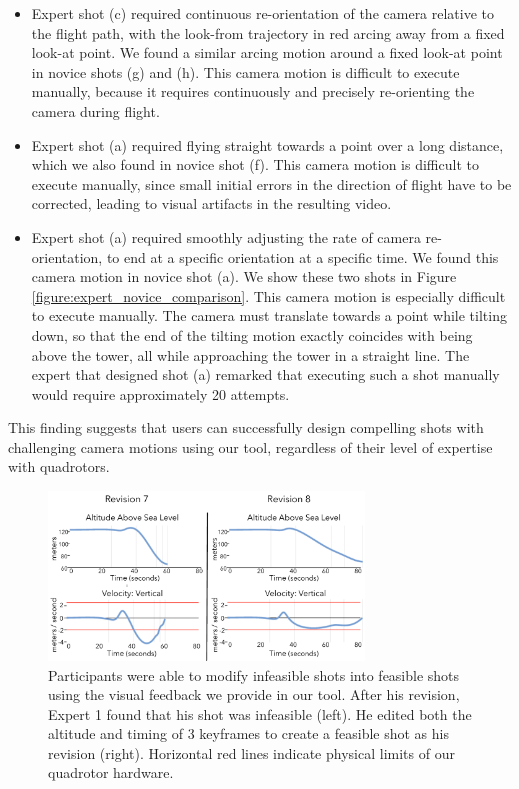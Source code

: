 \begin{itemize}

\item
Expert shot (c) required continuous re-orientation of the camera relative to the flight path, with the look-from trajectory in red arcing away from a fixed look-at point.
We found a similar arcing motion around a fixed look-at point in novice shots (g) and (h).
This camera motion is difficult to execute manually, because it requires continuously and precisely re-orienting the camera during flight.

\item
Expert shot (a) required flying straight towards a point over a long distance, which we also found in novice shot (f).
This camera motion is difficult to execute manually, since small initial errors in the direction of flight have to be corrected, leading to visual artifacts in the resulting video.

\item
Expert shot (a) required smoothly adjusting the rate of camera re-orientation, to end at a specific orientation at a specific time.
We found this camera motion in novice shot (a).
We show these two shots in Figure \ref{figure:expert_novice_comparison}.
This camera motion is especially difficult to execute manually.
The camera must translate towards a point while tilting down, so that the end of the tilting motion exactly coincides with being above the tower, all while approaching the tower in a straight line.
The expert that designed shot (a) remarked that executing such a shot manually would require approximately 20 attempts.

\end{itemize}

This finding suggests that users can successfully design compelling shots with challenging camera motions using our tool, regardless of their level of expertise with quadrotors.

\begin{figure}[t!]
  \centering
  \includegraphics[width=3.3in]{images/2015_siggraph_asia/edit-infeasible.pdf}
  \caption{
Participants were able to modify infeasible shots into feasible shots using the visual feedback we provide in our tool.
After his  revision, Expert 1 found that his shot was infeasible (left).
He edited both the altitude and timing of 3 keyframes to create a feasible shot as his  revision (right).
Horizontal red lines indicate physical limits of our quadrotor hardware.
}
  \label{figure:feasibility_fix}
\end{figure}

